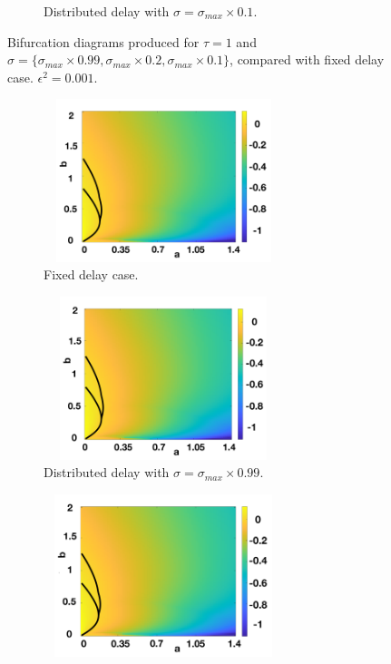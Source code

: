 \begin{figure}[H]
\begin{subfigure}[b]{0.45\textwidth}
        \caption{Distributed delay with $\sigma=\sigma_{max}\times0.1$.}
        \label{}
    \end{subfigure}
    \caption{Bifurcation diagrams produced for $\tau=1$ and $\sigma=\{ \sigma_{max}\times0.99,\sigma_{max}\times0.2,\sigma_{max}\times0.1 \}$, compared with fixed delay case. $\epsilon^2=0.001$.}
    \label{fig:distbif2}
\end{figure}
\begin{figure}[H]
    \centering
    \begin{subfigure}[b]{0.45\textwidth}
        \centering
        \includegraphics[width=7cm,height=4.75cm]{distbif41.png}
        \caption{Fixed delay case.}
        \label{}
    \end{subfigure}
    \hfill
    \begin{subfigure}[b]{0.45\textwidth}
        \centering
        \includegraphics[width=7cm,height=4.75cm]{distbif42.png}
        \caption{Distributed delay with $\sigma=\sigma_{max}\times0.99$.}
        \label{}
    \end{subfigure}
    \hfill
    \begin{subfigure}[b]{0.45\textwidth}
        \centering
        \includegraphics[width=7cm,height=4.75cm]{distbif43.png}

\end{subfigure}
\end{figure}
